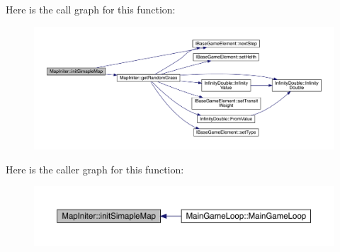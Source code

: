 Here is the call graph for this function\+:
\nopagebreak
\begin{figure}[H]
\begin{center}
\leavevmode
\includegraphics[width=350pt]{df/d24/a00217_ae6dfbed9cc8569db78442c0bfe57e252_cgraph}
\end{center}
\end{figure}
Here is the caller graph for this function\+:
\nopagebreak
\begin{figure}[H]
\begin{center}
\leavevmode
\includegraphics[width=350pt]{df/d24/a00217_ae6dfbed9cc8569db78442c0bfe57e252_icgraph}
\end{center}
\end{figure}

